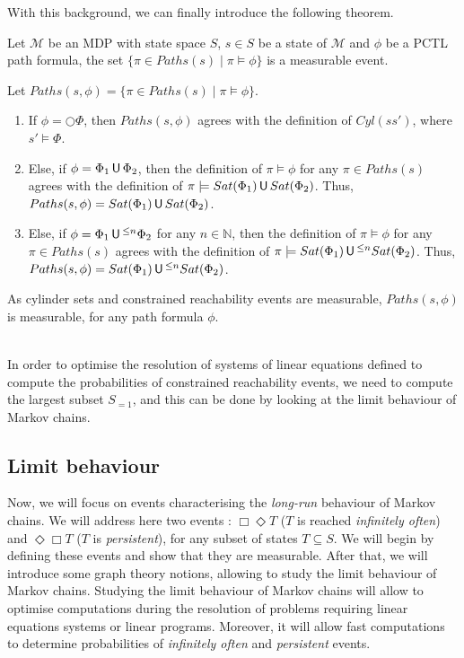With this background, we can finally introduce the following theorem.

\begin{theorem}
  Let $\mathcal{M}$ be an MDP with state space $S$, $s \in S$ be a state of $\mathcal{M}$ and $\phi$ be a PCTL path formula, the set $\{ \pi \in Paths(s) \; | \; \pi \models \phi \}$ is a measurable event.
\end{theorem}

\begin{proof2}
Let $Paths(s, \phi) = \{ \pi \in Paths(s) \; | \; \pi \models \phi \}$.
\begin{enumerate}
  \item If $\phi = \bigcirc \Phi$, then $Paths(s, \phi)$ agrees with the definition of $Cyl(ss')$, where $s' \models \Phi$.
  \item Else, if $\phi = \Phi_1 \,\text{\sffamily U}\, \Phi_2$, then the definition of
  $\pi \models \phi$ for any $\pi \in Paths(s)$ agrees with the definition of
  $\pi \models Sat(\Phi_1) \,\text{\sffamily U}\, Sat(\Phi_2)$.
  Thus, $Paths(s, \phi) = Sat(\Phi_1) \,\text{\sffamily U}\, Sat(\Phi_2)$.
  \item Else, if $\phi = \Phi_1 \,\text{\sffamily U}\,^{\leq n}\Phi_2$ for any $n \in \mathbb{N}$, then the definition of
  $\pi \models \phi$ for any $\pi \in Paths(s)$ agrees with the definition of
  $\pi \models Sat(\Phi_1) \,\text{\sffamily U}\,^{\leq n} Sat(\Phi_2)$.
  Thus, $Paths(s, \phi) = Sat(\Phi_1) \,\text{\sffamily U}\,^{\leq n} Sat(\Phi_2)$.
\end{enumerate}
As cylinder sets and constrained reachability events are measurable, $Paths(s, \phi)$ is measurable, for any path formula $\phi$.
\end{proof2}
\\

In order to optimise the resolution of systems of linear equations defined to compute the probabilities of constrained reachability events,
we need to compute the largest subset $S_{=1}$, and this can be done by looking at the limit behaviour of Markov chains.

\subsection{Limit behaviour}
Now, we will focus on events characterising the \textit{long-run} behaviour of Markov chains. We will address here two events : $\Box\Diamond T$ ($T$ is reached \textit{infinitely often})
and $\Diamond \Box T$ ($T$ is \textit{persistent}), for any subset of states $T \subseteq S$.
We will begin by defining these events and show that they are measurable. After that, we will introduce some graph theory notions, allowing to study the limit behaviour of Markov chains.
Studying the limit behaviour of Markov chains will allow to optimise
computations during the resolution of problems requiring linear equations systems or linear programs. Moreover, it will allow fast computations to determine probabilities of \textit{infinitely often} and \textit{persistent} events.

